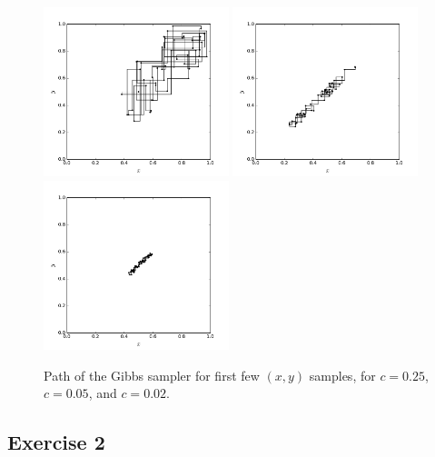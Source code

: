 \documentclass[12pt]{article}
\begin{document}
\begin{figure}
  \begin{center}
      \includegraphics[width=0.48\textwidth]{code/box-walk-c=0.25.png}
      \includegraphics[width=0.48\textwidth]{code/box-walk-c=0.05.png}
      \includegraphics[width=0.48\textwidth]{code/box-walk-c=0.02.png}
  \end{center}
    \caption{Path of the Gibbs sampler for first few $(x,y)$ samples, for $c = 0.25$, $c = 0.05$, and $c = 0.02$.}
  \label{figure:box-short}
\end{figure}


\subsection*{Exercise 2}
\end{document}
